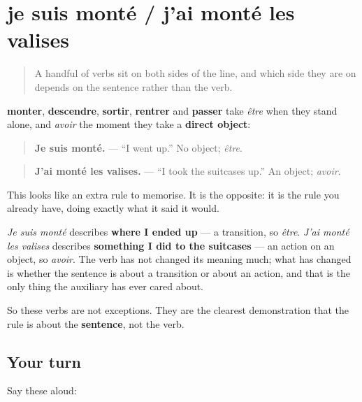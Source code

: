 \section[je suis monté / j'ai monté les valises]{je suis monté / j'ai monté les valises}

\label{lesson:FR-C16-bascule}



\begin{quote}
A handful of verbs sit on both sides of the line, and which side they are on depends on the sentence rather than the verb.
\end{quote}

\begin{grammarlens}[title={Grammar Lens: an object flips the auxiliary}]
\textbf{monter}, \textbf{descendre}, \textbf{sortir}, \textbf{rentrer} and \textbf{passer} take \emph{être} when they stand alone, and \emph{avoir} the moment they take a \textbf{direct object}:

\begin{quote}
\textbf{Je suis monté.} — \textquotedblleft{}I went up.\textquotedblright{} No object; \emph{être}.
\end{quote}

\begin{quote}
\textbf{J'ai monté les valises.} — \textquotedblleft{}I took the suitcases up.\textquotedblright{} An object; \emph{avoir}.
\end{quote}

This looks like an extra rule to memorise. It is the opposite: it is the rule you already have, doing exactly what it said it would.

\emph{Je suis monté} describes \textbf{where I ended up} — a transition, so \emph{être}. \emph{J'ai monté les valises} describes \textbf{something I did to the suitcases} — an action on an object, so \emph{avoir}. The verb has not changed its meaning much; what has changed is whether the sentence is about a transition or about an action, and that is the only thing the auxiliary has ever cared about.

So these verbs are not exceptions. They are the clearest demonstration that the rule is about the \textbf{sentence}, not the verb.
\end{grammarlens}

\subsection*{Your turn}
Say these aloud:

